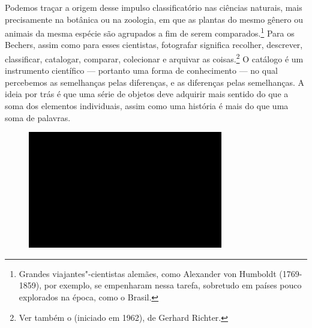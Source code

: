 Podemos traçar a origem desse impulso classificatório nas ciências \label{grid}
naturais, mais precisamente na botânica ou na zoologia, em que as
plantas do mesmo gênero ou animais da mesma espécie são agrupados a fim
de serem comparados.\footnote{Grandes viajantes"-cientistas alemães, como Alexander von Humboldt (1769-1859), por exemplo, se empenharam nessa tarefa, sobretudo em países pouco explorados na época, como o Brasil.} Para os Bechers, assim como para esses cientistas,
fotografar significa recolher, descrever, classificar, catalogar,
comparar, colecionar e arquivar as coisas.\footnote{Ver também o
  {} (iniciado em 1962), de Gerhard Richter.} O catálogo é um
instrumento científico --- portanto uma forma de conhecimento --- no qual
percebemos as semelhanças pelas diferenças, e as diferenças pelas
semelhanças. A ideia por trás é que uma série de objetos deve adquirir
mais sentido do que a soma dos elementos individuais, assim como uma
história é mais do que uma soma de palavras.

\begin{figure}[!ht]

\centering
 \includegraphics[width=85mm]{./imgs/im1.jpg}
\caption{\tiny{}}

\end{figure}


